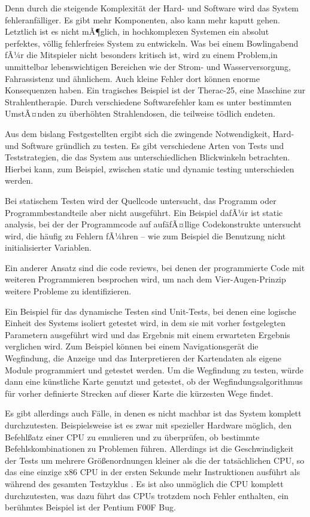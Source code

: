 Denn durch die steigende Komplexit{\"{a}}t der Hard- und Software wird das System fehleranf{\"{a}}lliger. Es gibt 
mehr Komponenten, also kann mehr kaputt gehen. Letztlich ist es nicht mÃ¶glich, in hochkomplexen Systemen ein 
absolut perfektes, v{\"{o}}llig fehlerfreies System zu entwickeln. 
Was bei einem Bowlingabend fÃ¼r die Mitspieler nicht besonders kritisch ist, wird zu einem Problem,in unmittelbar 
lebenswichtigen Bereichen wie der Strom- und Wasserversorgung, Fahrassistenz und {\"{a}}hnlichem. Auch kleine 
Fehler dort k{\"{o}}nnen enorme Konsequenzen haben. Ein tragisches Beispiel ist der Therac-25, eine Maschine zur 
Strahlentherapie. Durch verschiedene Softwarefehler kam es unter bestimmten UmstÃ¤nden zu {\"{u}}berh{\"{o}}hten 
Strahlendosen, die teilweise t{\"{o}}dlich endeten.

Aus dem bislang Festgestellten ergibt sich die zwingende Notwendigkeit, Hard- und Software gr{\"{u}}ndlich zu 
testen. Es gibt verschiedene Arten von Tests und Teststrategien, die das System aus unterschiedlichen Blickwinkeln 
betrachten. Hierbei kann, zum Beispiel, zwischen static und dynamic testing unterschieden werden. 

Bei statischem Testen wird der Quellcode untersucht, das Programm oder  Programmbestandteile aber nicht 
ausgef{\"{u}}hrt. Ein Beispiel dafÃ¼r ist static analysis, bei der der Programmcode auf auf{\"{a}}fÃ¤llige 
Codekonstrukte untersucht wird, die h{\"{a}}ufig zu Fehlern fÃ¼hren -- wie zum Beispiel die Benutzung nicht 
initialisierter Variablen. 

Ein anderer Ansatz sind die code reviews, bei denen der programmierte Code mit weiteren Programmieren besprochen 
wird, um nach dem Vier-Augen-Prinzip weitere Probleme zu identifizieren.

Ein Beispiel f{\"{u}}r das dynamische Testen sind Unit-Tests, bei denen eine logische Einheit des Systems isoliert 
getestet wird, in dem sie mit vorher festgelegten Parametern ausgef{\"{u}}hrt wird und das Ergebnis mit einem 
erwarteten Ergebnis verglichen wird. Zum Beispiel k{\"{o}}nnen bei einem Navigationsger{\"{a}}t die Wegfindung, die 
Anzeige und das Interpretieren der Kartendaten als eigene Module programmiert und getestet werden. Um die 
Wegfindung zu testen, w{\"{u}}rde dann eine k{\"{u}}nstliche Karte genutzt und getestet, ob der 
Wegfindungsalgorithmus f{\"{u}}r vorher definierte Strecken auf dieser Karte die k{\"{u}}rzesten Wege findet. 

Es gibt allerdings auch F{\"{a}}lle, in denen es nicht machbar ist das System komplett durchzutesten. 
Beispielsweise ist es zwar mit spezieller Hardware m{\"{o}}glich, den Befehl{\ss}atz einer CPU zu emulieren und zu 
{\"{u}}berpr{\"{u}}fen, ob bestimmte Befehlskombinationen zu Problemen f{\"{u}}hren. Allerdings ist die 
Geschwindigkeit der Tests um mehrere Gr{\"{o}}{\ss}enordnungen kleiner als die der tats{\"{a}}chlichen CPU, so das 
eine einzige x86 CPU in der ersten Sekunde mehr Instruktionen ausf{\"{u}}hrt als w{\"{a}}hrend des gesamten 
Testzyklus \cite{kaplan}. Es ist also unm{\"{o}}glich die CPU komplett durchzutesten, was dazu f{\"{u}}hrt das CPUs 
trotzdem noch Fehler enthalten, ein ber{\"{u}}hmtes Beispiel ist der Pentium F00F Bug.

